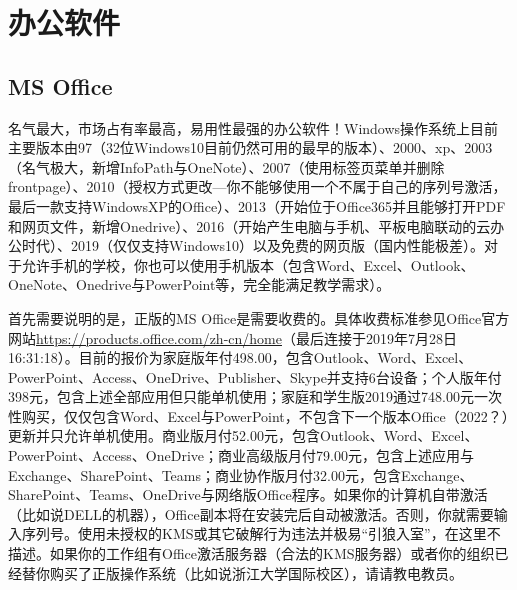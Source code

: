 \section{办公软件}
\subsection{MS Office}
名气最大，市场占有率最高，易用性最强的办公软件！Windows操作系统上目前主要版本由97（32位Windows10目前仍然可用的最早的版本）、2000、xp、2003（名气极大，新增InfoPath与OneNote）、2007（使用标签页菜单并删除frontpage）、2010（授权方式更改—你不能够使用一个不属于自己的序列号激活，最后一款支持WindowsXP的Office）、2013（开始位于Office365并且能够打开PDF和网页文件，新增Onedrive）、2016（开始产生电脑与手机、平板电脑联动的云办公时代）、2019（仅仅支持Windows10）以及免费的网页版（国内性能极差）。对于允许手机的学校，你也可以使用手机版本（包含Word、Excel、Outlook、OneNote、Onedrive与PowerPoint等，完全能满足教学需求）。\par
首先需要说明的是，正版的MS Office是需要收费的。具体收费标准参见Office官方网站\url{https://products.office.com/zh-cn/home}（最后连接于2019年7月28日16:31:18）。目前的报价为家庭版年付498.00，包含Outlook、Word、Excel、PowerPoint、Access、OneDrive、Publisher、Skype并支持6台设备；个人版年付398元，包含上述全部应用但只能单机使用；家庭和学生版2019通过748.00元一次性购买，仅仅包含Word、Excel与PowerPoint，不包含下一个版本Office（2022？）更新并只允许单机使用。商业版月付52.00元，包含Outlook、Word、Excel、PowerPoint、Access、OneDrive；商业高级版月付79.00元，包含上述应用与Exchange、SharePoint、Teams；商业协作版月付32.00元，包含Exchange、SharePoint、Teams、OneDrive与网络版Office程序。如果你的计算机自带激活（比如说DELL的机器），Office副本将在安装完后自动被激活。否则，你就需要输入序列号。使用未授权的KMS或其它破解行为违法并极易“引狼入室”，在这里不描述。如果你的工作组有Office激活服务器（合法的KMS服务器）或者你的组织已经替你购买了正版操作系统（比如说浙江大学国际校区），请请教电教员。
